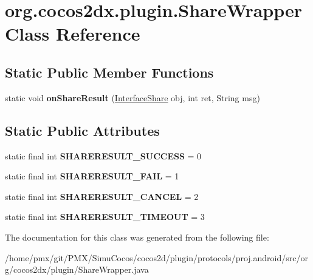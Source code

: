 \hypertarget{classorg_1_1cocos2dx_1_1plugin_1_1ShareWrapper}{}\section{org.\+cocos2dx.\+plugin.\+Share\+Wrapper Class Reference}
\label{classorg_1_1cocos2dx_1_1plugin_1_1ShareWrapper}
\subsection*{Static Public Member Functions}
\begin{DoxyCompactItemize}
\item 
\mbox{\label{classorg_1_1cocos2dx_1_1plugin_1_1ShareWrapper_a211cf97551f8f0bfb3ee0b4efb88ef6e}} 
static void {\bfseries on\+Share\+Result} (\hyperlink{interfaceorg_1_1cocos2dx_1_1plugin_1_1InterfaceShare}{Interface\+Share} obj, int ret, String msg)
\end{DoxyCompactItemize}
\subsection*{Static Public Attributes}
\begin{DoxyCompactItemize}
\item 
\mbox{\label{classorg_1_1cocos2dx_1_1plugin_1_1ShareWrapper_a97116cd012de1afd35a9156113c7cd24}} 
static final int {\bfseries S\+H\+A\+R\+E\+R\+E\+S\+U\+L\+T\+\_\+\+S\+U\+C\+C\+E\+SS} = 0
\item 
\mbox{\label{classorg_1_1cocos2dx_1_1plugin_1_1ShareWrapper_a9a06b2f08a9784320380c41af70e290d}} 
static final int {\bfseries S\+H\+A\+R\+E\+R\+E\+S\+U\+L\+T\+\_\+\+F\+A\+IL} = 1
\item 
\mbox{\label{classorg_1_1cocos2dx_1_1plugin_1_1ShareWrapper_a10018c7c335ad9c5b8ad3846c8c38bd9}} 
static final int {\bfseries S\+H\+A\+R\+E\+R\+E\+S\+U\+L\+T\+\_\+\+C\+A\+N\+C\+EL} = 2
\item 
\mbox{\label{classorg_1_1cocos2dx_1_1plugin_1_1ShareWrapper_a112842cec608b23c87ac564a2a06e4f8}} 
static final int {\bfseries S\+H\+A\+R\+E\+R\+E\+S\+U\+L\+T\+\_\+\+T\+I\+M\+E\+O\+UT} = 3
\end{DoxyCompactItemize}


The documentation for this class was generated from the following file\+:\begin{DoxyCompactItemize}
\item 
/home/pmx/git/\+P\+M\+X/\+Simu\+Cocos/cocos2d/plugin/protocols/proj.\+android/src/org/cocos2dx/plugin/Share\+Wrapper.\+java\end{DoxyCompactItemize}
